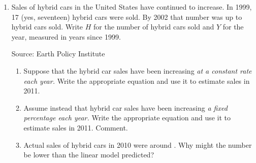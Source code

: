 \begin{enumerate}
\item  Sales of hybrid cars in the United States have continued to increase.  In 1999, 17 (yes, seventeen) hybrid cars were sold.  By 2002 that number was up to  hybrid cars sold. Write $H$ for the number of hybrid cars sold and $Y$ for the year, measured in years since 1999.  
\hfill \begin{footnotesize} Source: Earth Policy Institute \end{footnotesize}
\begin{enumerate}
\item Suppose that the hybrid car sales have been increasing \emph{at a constant rate each year.}  Write the appropriate equation and use it to estimate sales in 2011. 
\item Assume instead that hybrid car sales have been increasing \emph{a fixed percentage each year.} Write the appropriate equation and use it to estimate sales in 2011.  Comment.
\item Actual sales of hybrid cars in 2010 were around .  Why might the number be lower than the linear model predicted?
\end{enumerate}  


\end{enumerate}